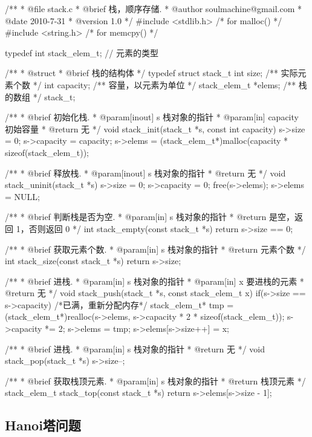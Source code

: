 \begin{Codex}[label=stack.c]
/** 
 * @file stack.c
 * @brief 栈，顺序存储.
 * @author soulmachine@gmail.com
 * @date 2010-7-31
 * @version 1.0
 */
#include <stdlib.h>  /* for malloc() */
#include <string.h>  /* for memcpy() */

typedef int stack_elem_t; // 元素的类型

/**
 * @struct
 * @brief 栈的结构体
 */
typedef struct stack_t {
    int     size;  /** 实际元素个数 */
    int     capacity; /** 容量，以元素为单位 */
    stack_elem_t  *elems;   /** 栈的数组 */
}stack_t;

/** 
 * @brief 初始化栈.
 * @param[inout] s 栈对象的指针
 * @param[in] capacity 初始容量
 * @return 无
 */
void stack_init(stack_t *s, const int capacity) {
    s->size = 0;
    s->capacity = capacity;
    s->elems = (stack_elem_t*)malloc(capacity * sizeof(stack_elem_t));
}

/** 
 * @brief 释放栈.
 * @param[inout] s 栈对象的指针
 * @return 无
 */
void stack_uninit(stack_t *s) {
    s->size = 0;
    s->capacity = 0;
    free(s->elems);
    s->elems = NULL;
}

/** 
 * @brief 判断栈是否为空.
 * @param[in] s 栈对象的指针
 * @return 是空，返回 1，否则返回 0
 */
int stack_empty(const stack_t *s) {
    return s->size == 0;
}

/** 
 * @brief 获取元素个数.
 * @param[in] s 栈对象的指针
 * @return 元素个数
 */
int stack_size(const stack_t *s) {
    return s->size;
}

/** 
 * @brief 进栈.
 * @param[in] s 栈对象的指针
 * @param[in] x 要进栈的元素
 * @return 无
 */
void stack_push(stack_t *s, const stack_elem_t x)
{
    if(s->size == s->capacity) { /*已满，重新分配内存*/
        stack_elem_t* tmp = (stack_elem_t*)realloc(s->elems, 
            s->capacity * 2 * sizeof(stack_elem_t));
        s->capacity *= 2;
        s->elems = tmp;
    }
    s->elems[s->size++] = x;
}

/** 
 * @brief 进栈.
 * @param[in] s 栈对象的指针
 * @return 无
 */
void stack_pop(stack_t *s) {
    s->size--;
}

/** 
 * @brief 获取栈顶元素.
 * @param[in] s 栈对象的指针
 * @return 栈顶元素
 */
stack_elem_t stack_top(const stack_t *s) {
    return s->elems[s->size - 1];
}
\end{Codex}

\subsection{Hanoi塔问题}

